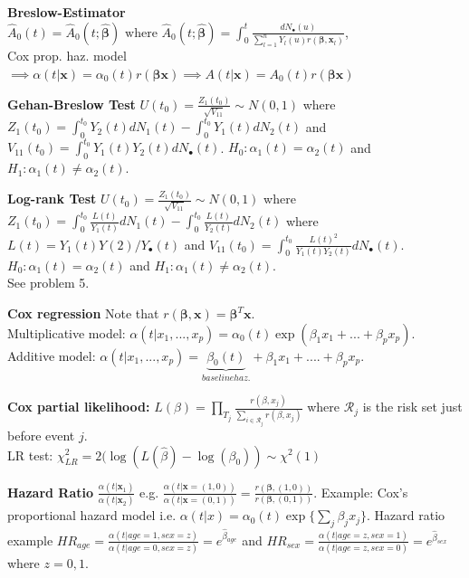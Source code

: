 \documentclass{article}
\begin{document}
\textbf{Breslow-Estimator} $\hat A_0(t) = \hat A_0(t;\hat{\mathbf{\beta}}) \text{ where } 
\hat A_0(t;\hat{\mathbf{\beta}}) = \int_0^t\frac{dN_{\bullet}(u)}{\sum_{l=1}^n Y_l(u)r(\mathbf{\beta}, \mathbf{x}_l)}$, \\ 
Cox prop. haz. model $\implies \alpha(t | \mathbf{x}) = \alpha_0(t)r(\mathbf{\beta}\mathbf{x}) \implies A(t | \mathbf{x}) = A_0(t)r(\mathbf{\beta}\mathbf{x})$

\medskip

\textbf{Gehan-Breslow Test}
$U(t_0) = \frac{Z_1(t_0)}{\sqrt{V_{11}}} \sim N(0,1)$ where 
$Z_1(t_0) = \int_0^{t_0} Y_2(t)dN_1(t) -\int_0^{t_0} Y_1(t)dN_2(t)$ and 
$V_{11}(t_0) = \int_0^{t_0} Y_1(t)Y_2(t)dN_{\bullet}(t)$.
$H_0: \alpha_1 (t) = \alpha_2 (t)$ and $H_1: \alpha_1 (t) \neq \alpha_2 (t)$.

\textbf{Log-rank Test}
$U(t_0) = \frac{Z_1(t_0)}{\sqrt{V_{11}}} \sim N(0,1)$ where 
$Z_1(t_0) = \int_0^{t_0} \frac{L(t)}{Y_1(t)}dN_1(t) -\int_0^{t_0} \frac{L(t)}{Y_2(t)}dN_2(t)$ where $L(t) = Y_1(t)Y(2)/Y_{\bullet}(t)$ and 
$V_{11}(t_0) = \int_0^{t_0} \frac{L(t)^2}{Y_1(t)Y_2(t)} dN_{\bullet}(t)$.
$H_0: \alpha_1 (t) = \alpha_2 (t)$ and $H_1: \alpha_1 (t) \neq \alpha_2 (t)$. \\

See problem 5. 


\medskip

\textbf{Cox regression} Note that $r(\boldsymbol\beta, \mathbf{x})= \boldsymbol\beta^T\mathbf{x}$. \\
Multiplicative model: $\alpha(t|x_1,...,x_p) = \alpha_0(t)\exp (\beta_1x_1+...+\beta_px_p)$. \\
Additive model:  $\alpha(t|x_1,...,x_p) = \underbrace{\beta_0(t)}_{baseline haz.} + \beta_1 x_1 + ....+ \beta_p x_p$.

\textbf{Cox partial likelihood:}
$L(\beta) = \prod_{T_j} \frac{r(\beta, x_j)}{\sum_{i \in \mathcal{R}_j} r(\beta, x_j)}$ where $\mathcal{R}_j$ is the risk set just before event $j$.\\ 
LR test: $\chi^2_{LR} = 2(\log (L(\hat{\beta}) - \log(\beta_0)) \sim \chi^2(1)$

\medskip

\textbf{Hazard Ratio} $\frac{\alpha(t|\mathbf{x}_1)}{\alpha(t|\mathbf{x}_2)}$ e.g. $\frac{\alpha(t|\mathbf{x} =(1,0))}{\alpha(t|\mathbf{x} =(0,1))} = \frac{r(\mathbf{\beta}, (1,0))}{r(\mathbf{\beta}, (0,1))}$. 
Example: Cox's proportional hazard model i.e. $\alpha(t|x) = \alpha_0(t) \exp \{ \sum_j \beta_j x_j\}$. Hazard ratio example $HR_{age} = \frac{\alpha(t| age = 1, sex = z)}{\alpha(t| age = 0, sex = z)} = e^{\hat{\beta}_{age}}$ and $HR_{sex} = \frac{\alpha(t| age = z, sex = 1)}{\alpha(t| age = z, sex = 0)} = e^{\hat{\beta}_{sex}}$ where $z=0,1$.
\end{document}
